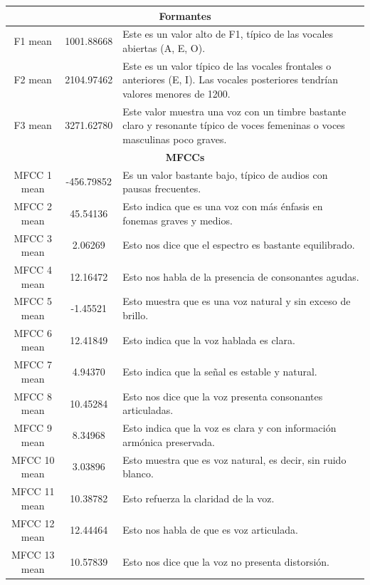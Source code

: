 \begin{longtable}{|c|c|p{8cm}|}
\multicolumn{3}{|c|}{\textbf{Formantes}} \\ \hline
F1 mean & 1001.88668 & Este es un valor alto de F1, típico de las vocales abiertas (A, E, O). \\ \hline
F2 mean & 2104.97462 & Este es un valor típico de las vocales frontales o anteriores (E, I). Las vocales posteriores tendrían valores menores de 1200. \\ \hline
F3 mean & 3271.62780 & Este valor muestra una voz con un timbre bastante claro y resonante típico de voces femeninas o voces masculinas poco graves. \\ \hline

\multicolumn{3}{|c|}{\textbf{MFCCs}} \\ \hline
MFCC 1 mean & -456.79852 & Es un valor bastante bajo, típico de audios con pausas frecuentes. \\ \hline
MFCC 2 mean & 45.54136 & Esto indica que es una voz con más énfasis en fonemas graves y medios. \\ \hline
MFCC 3 mean & 2.06269 & Esto nos dice que el espectro es bastante equilibrado. \\ \hline
MFCC 4 mean & 12.16472 & Esto nos habla de la presencia de consonantes agudas. \\ \hline
MFCC 5 mean & -1.45521 & Esto muestra que es una voz natural y sin exceso de brillo. \\ \hline
MFCC 6 mean & 12.41849 & Esto indica que la voz hablada es clara. \\ \hline
MFCC 7 mean & 4.94370 & Esto indica que la señal es estable y natural. \\ \hline
MFCC 8 mean & 10.45284 & Esto nos dice que la voz presenta consonantes articuladas. \\ \hline
MFCC 9 mean & 8.34968 & Esto indica que la voz es clara y con información armónica preservada. \\ \hline
MFCC 10 mean & 3.03896 & Esto muestra que es voz natural, es decir, sin ruido blanco. \\ \hline
MFCC 11 mean & 10.38782 & Esto refuerza la claridad de la voz. \\ \hline
MFCC 12 mean & 12.44464 & Esto nos habla de que es voz articulada. \\ \hline
MFCC 13 mean & 10.57839 & Esto nos dice que la voz no presenta distorsión. \\ \hline

\end{longtable}


